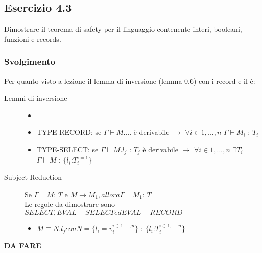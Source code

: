 	 
\subsection*{Esercizio 4.3}
Dimostrare il teorema di safety per il linguaggio contenente interi, booleani, funzioni e records.

\subsubsection*{Svolgimento}
Per quanto visto a lezione il lemma di inversione (lemma 0.6) con i record e il \`e:
\begin{description}

\item[Lemmi di inversione]{
	
\begin{itemize}

	\item 
	\item TYPE-RECORD: se $\Gamma \vdash M....$ \`e derivabile $\rightarrow$ $\forall i \in 1,...,n$ $\Gamma \vdash M_i$ : $T_i$ 
	
	\item TYPE-SELECT: se $\Gamma \vdash M.l_j$ : $T_j$ \`e derivabile $\rightarrow$ $\forall i \in 1,...,n$ $\exists T_i$ $\Gamma \vdash M$ : $ \{ l_i$:$T_i^{i=1} \}$ 
\end{itemize}

}

\item[Subject-Reduction]	{

	Se $\Gamma \vdash M $: $T$ e $M \rightarrow M_1, allora  \Gamma \vdash M_1 $: $T$\\
	Le regole da dimostrare sono $SELECT, EVAL-SELECT ed EVAL-RECORD$
	
	\begin{itemize}
		\item $M \equiv N.l_j con N = \{ l_i = v_i ^{i \in 1,...,n} \}$ : $\{ l_i $:$ T_i ^{i \in 1,...,n} \}$
	\end{itemize}


}

\end{description}


\textbf{{\color{red} DA FARE}}
	